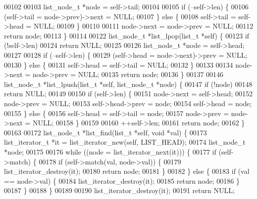 \begin{DoxyCode}
00102 
00103   list_node_t *node = \textcolor{keyword}{self}->tail;
00104 
00105   \textcolor{keywordflow}{if} (--self->len) \{
00106     (\textcolor{keyword}{self}->tail = node->prev)->next = NULL;
00107   \} \textcolor{keywordflow}{else} \{
00108     \textcolor{keyword}{self}->tail = \textcolor{keyword}{self}->head = NULL;
00109   \}
00110 
00111   node->next = node->prev = NULL;
00112   \textcolor{keywordflow}{return} node;
00113 \}
00114 
00122 list_node_t *list_lpop(list_t *\textcolor{keyword}{self}) \{
00123   \textcolor{keywordflow}{if} (!self->len)
00124     \textcolor{keywordflow}{return} NULL;
00125 
00126   list_node_t *node = \textcolor{keyword}{self}->head;
00127 
00128   \textcolor{keywordflow}{if} (--self->len) \{
00129     (\textcolor{keyword}{self}->head = node->next)->prev = NULL;
00130   \} \textcolor{keywordflow}{else} \{
00131     \textcolor{keyword}{self}->head = \textcolor{keyword}{self}->tail = NULL;
00132   \}
00133 
00134   node->next = node->prev = NULL;
00135   \textcolor{keywordflow}{return} node;
00136 \}
00137 
00146 list_node_t *list_lpush(list_t *\textcolor{keyword}{self}, list_node_t *node) \{
00147   \textcolor{keywordflow}{if} (!node)
00148     \textcolor{keywordflow}{return} NULL;
00149 
00150   \textcolor{keywordflow}{if} (self->len) \{
00151     node->next = \textcolor{keyword}{self}->head;
00152     node->prev = NULL;
00153     \textcolor{keyword}{self}->head->prev = node;
00154     \textcolor{keyword}{self}->head = node;
00155   \} \textcolor{keywordflow}{else} \{
00156     \textcolor{keyword}{self}->head = \textcolor{keyword}{self}->tail = node;
00157     node->prev = node->next = NULL;
00158   \}
00159 
00160   ++\textcolor{keyword}{self}->len;
00161   \textcolor{keywordflow}{return} node;
00162 \}
00163 
00172 list_node_t *list_find(list_t *\textcolor{keyword}{self}, \textcolor{keywordtype}{void} *val) \{
00173   list_iterator_t *it = list_iterator_new(\textcolor{keyword}{self}, LIST_HEAD);
00174   list_node_t *node;
00175 
00176   \textcolor{keywordflow}{while} ((node = list_iterator_next(it))) \{
00177     \textcolor{keywordflow}{if} (self->match) \{
00178       \textcolor{keywordflow}{if} (self->match(val, node->val)) \{
00179         list_iterator_destroy(it);
00180         \textcolor{keywordflow}{return} node;
00181       \}
00182     \} \textcolor{keywordflow}{else} \{
00183       \textcolor{keywordflow}{if} (val == node->val) \{
00184         list_iterator_destroy(it);
00185         \textcolor{keywordflow}{return} node;
00186       \}
00187     \}
00188   \}
00189 
00190   list_iterator_destroy(it);
00191   \textcolor{keywordflow}{return} NULL;

\end{DoxyCode}
